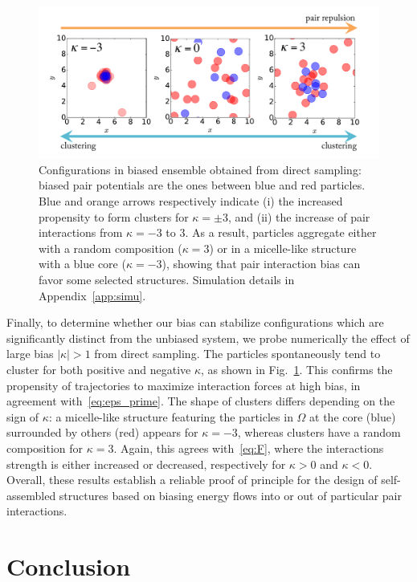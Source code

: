 \documentclass[pre, superscriptaddress, twocolumn,pre]{revtex4-1}
\begin{document}
\begin{figure}
	\centering
	\includegraphics[width=.8\linewidth]{Fig_outofperturbation}
	\caption{\label{fig:outofperturbation}
	Configurations in biased ensemble obtained from direct sampling: biased pair potentials are the ones between blue and red particles. Blue and orange arrows respectively indicate (i) the increased propensity to form clusters for $\kappa=\pm3$, and (ii) the increase of pair interactions from $\kappa=-3$ to $3$. As a result, particles aggregate either with a random composition ($\kappa=3$) or in a micelle-like structure with a blue core ($\kappa=-3$), showing that pair interaction bias can favor some selected structures.
		Simulation details in Appendix~\ref{app:simu}.
	}
\end{figure}


Finally, to determine whether our bias can stabilize configurations which are significantly distinct from the unbiased system, we probe numerically the effect of large bias $|\kappa|>1$ from direct sampling. The particles spontaneously tend to cluster for both positive and negative $\kappa$, as shown in Fig.~\ref{fig:outofperturbation}. This confirms the propensity of trajectories to maximize interaction forces at high bias, in agreement with~\eqref{eq:eps_prime}. The shape of clusters differs depending on the sign of $\kappa$: a micelle-like structure featuring the particles in $\Omega$ at the core (blue) surrounded by others (red) appears for $\kappa=-3$, whereas clusters have a random composition for $\kappa=3$. Again, this agrees with~\eqref{eq:F}, where the interactions strength is either increased or decreased, respectively for $\kappa>0$ and $\kappa<0$. Overall, these results establish a reliable proof of principle for the design of self-assembled structures based on biasing energy flows into or out of particular pair interactions.




\section{Conclusion}
\end{document}
